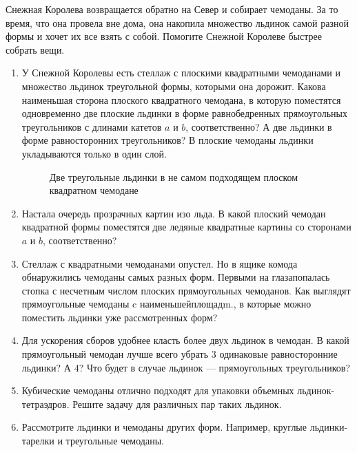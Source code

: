 ﻿\newcommand{\mb}[1]{\mathbb{#1}}
\newcommand{\conv}{\operatorname{conv}}

Снежная Королева возвращается обратно на Север и собирает чемоданы. За то время, что она провела вне дома, она накопила множество льдинок самой разной формы и хочет их все взять с собой. Помогите Снежной Королеве быстрее собрать вещи.

\begin{enumerate}
\item У Снежной Королевы есть стеллаж с плоскими квадратными чемоданами и множество льдинок треугольной формы, которыми она дорожит. Какова наименьшая сторона плоского квадратного чемодана, в которую поместятся одновременно две плоские льдинки в форме равнобедренных прямоугольных треугольников с длинами катетов $a$ и $b$, соответственно? А две льдинки в форме равносторонних треугольников? В плоские чемоданы льдинки укладываются только в один слой.
\begin{figure}[h]
\begin{center}
\end{center}
\caption{Две треугольные льдинки в не самом подходящем плоском квадратном чемодане}
\end{figure}
\item Настала очередь прозрачных картин изо льда. В какой плоский чемодан квадратной формы поместятся две ледяные квадратные картины со сторонами $a$ и $b$, соответственно?
\item Стеллаж с квадратными чемоданами опустел. Но в ящике комода обнаружились чемоданы самых разных форм. Первыми на глаза\linebreak попалась стопка с несчетным числом плоских прямоугольных чемоданов. Как выглядят прямоугольные чемоданы c наименьшей\linebreak площадm., в которые можно поместить льдинки уже рассмотренных форм?
\item Для ускорения сборов удобнее класть более двух льдинок в чемодан. В какой прямоугольный чемодан лучше всего убрать $3$ одинаковые равносторонние льдинки? А $4$? Что будет в случае льдинок --- прямоугольных треугольников?
\item Кубические чемоданы отлично подходят для упаковки объемных льдинок-тетраэдров. Решите задачу для различных пар таких льдинок.
\item Рассмотрите льдинки и чемоданы других форм. Например, круглые льдинки-тарелки и треугольные чемоданы.
\end{enumerate}


